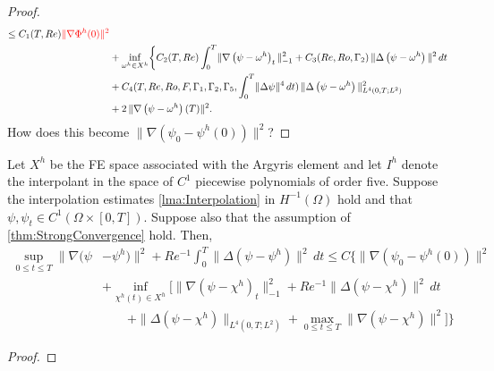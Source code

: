 \begin{proof}
\begin{align*}
      \le C_1(T,Re){\color{red} \|\nabla \Phi^h(0)\|^2} \\
      & + \inf_{\omega^h \in X^h} \biggl\{C_2(T,Re)
      \int_0^T\! \|\nabla \left( \psi - \omega^h\right)_t\|_{-1}^2
      + C_3(Re,Ro,\Gamma_2)\,\|\Delta \left(\psi - \omega^h\right)\|^2\, dt \\
      & + C_4(T,Re,Ro,F,\Gamma_1,\Gamma_2,\Gamma_5,\int_{0}^{T}\!\|\Delta
      \psi\|^4\, dt)\, \|\Delta \left(\psi - \omega^h\right)\|^2_{L^4(0,T;L^2)} \\
    & + 2\, \|\nabla \left(\psi - \omega^h\right)(T)\|^2.
  \end{align*}
  {\color{red} How does this become $\|\nabla\left(\psi_0 - \psi^h(0)\right)\|^2$?}
\end{proof}

\begin{lemma} \label{lma:Interpolation}

\end{lemma}

\begin{thm} \label{thm:SemiInterp}
  Let $X^h$ be the FE space associated with the Argyris element and let $I^h$
  denote the interpolant in the space of $C^1$ piecewise polynomials of order
  five. Suppose the interpolation estimates \autoref{lma:Interpolation}
  in $H^{-1}(\Omega)$ hold and that $\psi, \psi_t \in C^1(\Omega\times [0,T])$.
  Suppose also that the assumption of \autoref{thm:StrongConvergence} hold.
  Then,
  \begin{equation}
    \begin{split}
      \sup_{0\le t \le T} \|\nabla (\psi &- \psi^h) \|^2 + Re^{-1}
        \int_{0}^{T}\! \|\Delta (\psi - \psi^h)\|^2 \, dt \le C\biggl\{
          \|\nabla(\psi_0 - \psi^h(0))\|^2 \\
        & + \inf_{\chi^h(t) \in X^h} \biggl[\|\nabla(\psi - \chi^h)_t\|^2_{-1} +
          Re^{-1} \|\Delta(\psi - \chi^h)\|^2\, dt \\
        & \qquad + \|\Delta(\psi - \chi^h)\|_{L^4(0,T;L^2)} + \max_{0 \le t \le T}
          \|\nabla (\psi - \chi^h)\|^2\biggr] \biggr\}
    \end{split}
    \label{eqn:SemiInterp}
  \end{equation}
\end{thm}
\begin{proof}

\end{proof}
